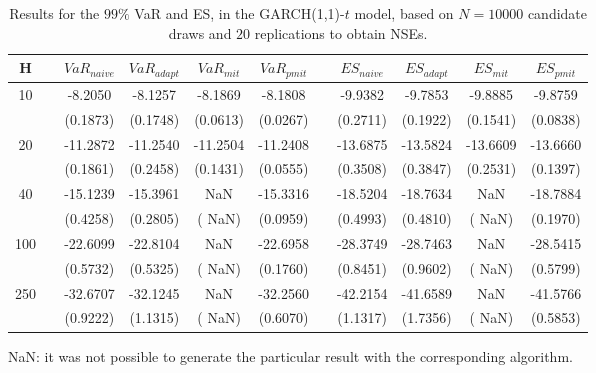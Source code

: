 \begin{table}[h] 
\centering 
\caption{Results for the $99\%$ VaR and ES, in the GARCH(1,1)-$t$ model, based on $N=10000$ candidate draws and $20$ replications to obtain NSEs.} 
\label{tab:res_algos_t_garch2_noS} 
\begin{tabular}{ccccccccccc}  
 H & & $VaR_{naive}$ & $VaR_{adapt}$ & $VaR_{mit}$  & $VaR_{pmit}$ &  & $ES_{naive}$ & $ES_{adapt}$ & $ES_{mit}$ & $ES_{pmit}$ \\ \hline 
10 & & -8.2050 & -8.1257 & -8.1869 & -8.1808 & & -9.9382 & -9.7853 & -9.8885 & -9.8759  \\ 
 & & (0.1873) & (0.1748) & (0.0613) & (0.0267) & & (0.2711) & (0.1922) & (0.1541) & (0.0838)   \\ [1ex] 
20 & & -11.2872 & -11.2540 & -11.2504 & -11.2408 & & -13.6875 & -13.5824 & -13.6609 & -13.6660  \\ 
 & & (0.1861) & (0.2458) & (0.1431) & (0.0555) & & (0.3508) & (0.3847) & (0.2531) & (0.1397)   \\ [1ex] 
40 & & -15.1239 & -15.3961 &    NaN & -15.3316 & & -18.5204 & -18.7634 &    NaN & -18.7884  \\ 
 & & (0.4258) & (0.2805) & (   NaN) & (0.0959) & & (0.4993) & (0.4810) & (   NaN) & (0.1970)   \\ [1ex] 
100 & & -22.6099 & -22.8104 &    NaN & -22.6958 & & -28.3749 & -28.7463 &    NaN & -28.5415  \\ 
 & & (0.5732) & (0.5325) & (   NaN) & (0.1760) & & (0.8451) & (0.9602) & (   NaN) & (0.5799)   \\ [1ex] 
250 & & -32.6707 & -32.1245 &    NaN & -32.2560 & & -42.2154 & -41.6589 &    NaN & -41.5766  \\ 
 & & (0.9222) & (1.1315) & (   NaN) & (0.6070) & & (1.1317) & (1.7356) & (   NaN) & (0.5853)   \\ [1ex] 
\hline 
\end{tabular} 
\raggedright 

\vspace{5pt}\footnotesize{NaN: it was not possible to generate the particular result with the corresponding algorithm.} 
\end{table} 
